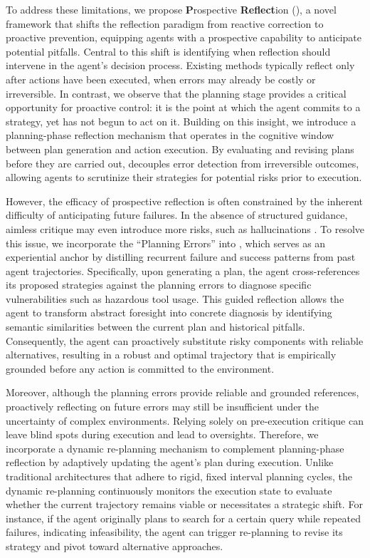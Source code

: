 To address these limitations, we propose \textbf{P}rospective \textbf{Reflect}ion (\textbf{\method}), a novel framework that shifts the reflection paradigm from reactive correction to proactive prevention, equipping agents with a prospective capability to anticipate potential pitfalls.
Central to this shift is identifying when reflection should intervene in the agent’s decision process. Existing methods typically reflect only after actions have been executed, when errors may already be costly or irreversible. In contrast, we observe that the planning stage provides a critical opportunity for proactive control: it is the point at which the agent commits to a strategy, yet has not begun to act on it.
Building on this insight, we introduce a planning-phase reflection mechanism that operates in the cognitive window between plan generation and action execution. By evaluating and revising plans before they are carried out, \method decouples error detection from irreversible outcomes, allowing agents to scrutinize their strategies for potential risks prior to execution.

  
However, the efficacy of prospective reflection is often constrained by the inherent difficulty of anticipating future failures. In the absence of structured guidance, aimless critique may even introduce more risks, such as hallucinations \citep{zhu2025llm}. To resolve this issue, we incorporate the ``Planning Errors'' into \method, which serves as an experiential anchor by distilling recurrent failure and success patterns from past agent trajectories. Specifically, upon generating a plan, the agent cross-references its proposed strategies against the planning errors to diagnose specific vulnerabilities such as hazardous tool usage. This guided reflection allows the agent to transform abstract foresight into concrete diagnosis by identifying semantic similarities between the current plan and historical pitfalls. Consequently, the agent can proactively substitute risky components with reliable alternatives, resulting in a robust and optimal trajectory that is empirically grounded before any action is committed to the environment.

Moreover, although the planning errors provide reliable and grounded references, proactively reflecting on future errors may still be insufficient under the uncertainty of complex environments. Relying solely on pre-execution critique can leave blind spots during execution and lead to oversights. Therefore, we incorporate a dynamic re-planning mechanism to complement planning-phase reflection by adaptively updating the agent’s plan during execution.  Unlike traditional architectures that adhere to rigid, fixed interval planning cycles, the dynamic re-planning continuously monitors the execution state to evaluate whether the current trajectory remains viable or necessitates a strategic shift. For instance, if the agent originally plans to search for a certain query while repeated failures, indicating infeasibility, the agent can trigger re-planning to revise its strategy and pivot toward alternative approaches.


